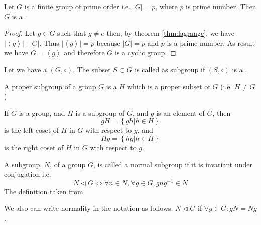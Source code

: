 \begin{appendices}
\begin{theorem}
  Let $G$ is a finite group of prime order i.e.
  $\left|G\right| = p$, where $p$ is prime number. Then $G$ is a
  . 
  \label{thm:finite_group_of_prime_order}
  \begin{proof}
    Let $g \in G$ such that $g \ne e$ then, by theorem
    \ref{thm:lagrange},
    we have 
    $\left|\left<g\right>\right| \mid \left|G\right|$. Thus
    $\left|\left<g\right>\right| = p$ because 
    $\left|G\right| = p$ and $p$ is a prime number. As result we have
    $G = \left<g\right>$ and therefore $G$ is a cyclic group.
  \end{proof}
\end{theorem}

\begin{definition}[Subgroup]
  Let we have a  $\left(G, \circ\right)$. The
  subset $S \subset G$ is called as subgroup if $\left(S,
  \circ\right)$ is a .
  \label{def:subgroup}
\end{definition}

\begin{definition}
  A proper subgroup of a group $G$ is a  $H$
  which is a proper subset of $G$ (i.e. $H \ne G$) \cite{wiki:group}
  \label{def:propersubgroup}
\end{definition}

\begin{definition}[Coset]
  If $G$ is a group, and $H$ is a subgroup of $G$, and $g$ is an
  element of $G$, then
  \[
  gH = \left\{ gh \vert h \in H\right\}
  \]
  is the left coset of $H$ in $G$ with respect to $g$, and
  \[
  Hg = \left\{ hg \vert h \in H\right\}
  \]
  is the right coset of $H$ in $G$ with respect to $g$.
  \label{def:coset}
\end{definition}

\begin{definition}
  A subgroup, $N$, of a group $G$, is called a normal subgroup if it
  is invariant under conjugation i.e. 
  \[
  N \triangleleft G \Leftrightarrow
  \forall n \in N, \forall g \in G, g n g^{-1} \in N
  \]  
  The definition taken from \cite{wiki:normalsubgroup}

  We also can write normality in the  notation as
  follows.
  $N \triangleleft G$ if $\forall g \in G: gN = Ng$.
  \label{def:normalsubgroup}
\end{definition}


\end{appendices}
